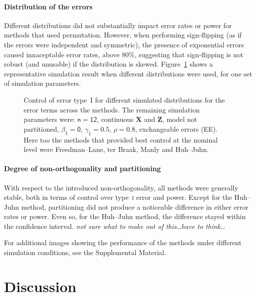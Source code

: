 \paragraph{Distribution of the errors} Different distributions did not substantially impact error rates or power for methods that used permutation. However, when performing sign-flipping (as if the errors were independent and symmetric), the presence of exponential errors caused innaceptable error rates, above 80\%, suggesting that sign-flipping is not robust (and unusable) if the distribution is skewed. Figure~\ref{fig:simulations-d} shows a representative simulation result when different distributions were used, for one set of simulation parameters.

\begin{figure}[!p]
\centering
\caption{Control of error type~I for different simulated distributions for the error terms across the methods. The remaining simulation parameters were: $\mathsf{n=12}$, continuous $\mathbf{X}$ and $\mathbf{Z}$, model not partitioned, $\mathsf{\beta_1=0}$, $\mathsf{\gamma_1=0.5}$, $\mathsf{\rho=0.8}$, exchangeable errors ({\scriptsize EE}). Here too the methods that provided best control at the nominal level were Freedman--Lane, ter Braak, Manly and Huh--Juhn.}
\label{fig:simulations-d}
\end{figure}

\paragraph{Degree of non-orthogonality and partitioning} With respect to the introduced non-orthogonality, all methods were generally stable, both in terms of control over type~\textsc{i} error and power. Except for the Huh--Juhn method, partitioning did not produce a noticeable difference in either error rates or power. Even so, for the Huh--Juhn method, the difference stayed within the confidence interval. {\color{orange}\emph{not sure what to make out of this\ldots have to think\ldots}}

\vspace*{3mm}

For additional images showing the performance of the methods under different simulation conditions, see the Supplemental Material.

\section{Discussion}

